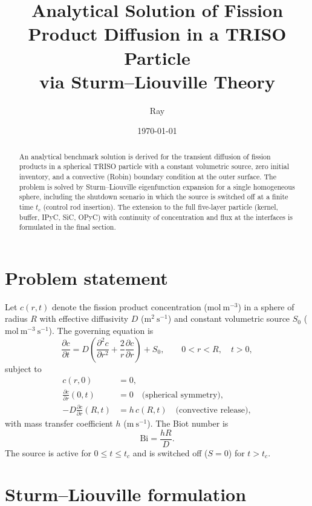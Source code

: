 \documentclass[11pt,a4paper]{article}
\title{Analytical Solution of Fission Product Diffusion in a TRISO Particle\\
via Sturm--Liouville Theory}
\author{Ray}
\date{\today}
\newcommand{\Bi}{\mathrm{Bi}}
\begin{document}
\maketitle

\begin{abstract}
An analytical benchmark solution is derived for the transient diffusion of fission
products in a spherical TRISO particle with a constant volumetric source, zero initial
inventory, and a convective (Robin) boundary condition at the outer surface. The problem
is solved by Sturm--Liouville eigenfunction expansion for a single homogeneous sphere,
including the shutdown scenario in which the source is switched off at a finite time
$t_c$ (control rod insertion). The extension to the full five-layer particle (kernel,
buffer, IPyC, SiC, OPyC) with continuity of concentration and flux at the interfaces is
formulated in the final section.
\end{abstract}

\section{Problem statement}

Let $c(r,t)$ denote the fission product concentration
($\mathrm{mol\ m^{-3}}$) in a sphere of radius $R$ with effective diffusivity $D$
($\mathrm{m^2\ s^{-1}}$) and constant volumetric source $S_0$
($\mathrm{mol\ m^{-3}\ s^{-1}}$). The governing equation is
\begin{equation}
\frac{\partial c}{\partial t}
= D\left(\frac{\partial^2 c}{\partial r^2} + \frac{2}{r}\frac{\partial c}{\partial r}\right) + S_0,
\qquad 0 < r < R,\quad t > 0,
\label{eq:pde}
\end{equation}
subject to
\begin{align}
c(r,0) &= 0, \label{eq:ic}\\
\frac{\partial c}{\partial r}(0,t) &= 0 \quad\text{(spherical symmetry)}, \label{eq:bc0}\\
-D\frac{\partial c}{\partial r}(R,t) &= h\,c(R,t) \quad\text{(convective release)}, \label{eq:bcR}
\end{align}
with mass transfer coefficient $h$ ($\mathrm{m\ s^{-1}}$). The Biot number is
\begin{equation}
\Bi = \frac{hR}{D}.
\end{equation}
The source is active for $0 \le t \le t_c$ and is switched off ($S=0$) for $t > t_c$.

\section{Sturm--Liouville formulation}
\end{document}
